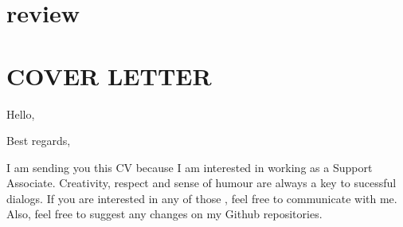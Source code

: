 \documentclass[11pt,a4paper,sans]{moderncv}
\begin{document}
\section{review}
\clearpage
\section{COVER LETTER}
\date{\today}
\opening{Hello,}
\closing{Best regards,}
\makelettertitle

I am sending you this CV because I am interested in working as a Support 
Associate. Creativity, respect and sense of humour are always a key to 
sucessful dialogs. 
If you are interested in any of those , feel free to communicate with me. 
Also, feel free to suggest any changes on my Github repositories. 

\makeletterclosing
\end{document}
